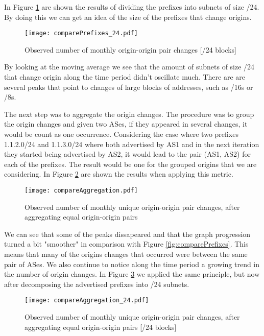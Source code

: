 \documentclass[11pt,a4paper]{scrreprt}
\begin{document}
In Figure \ref{fig:comparePrefixes_24} are shown the results of dividing the prefixes into subnets of size /24. By doing this we can get an idea of the size of the prefixes that change origins.  

\begin{figure}[!h]
\centering
\texttt{[image: comparePrefixes\_24.pdf]}
\caption{Observed number of monthly
origin-origin pair changes [/24 blocks]}
\label{fig:comparePrefixes_24}
\end{figure}

By looking at the moving average we see that the amount of subnets of size /24 that change origin along the time period didn't oscillate much. There are are several peaks that point to changes of large blocks of addresses, such as /16s or /8s.

The next step was to aggregate the origin changes. The procedure was to group the origin changes and given two ASes, if they appeared in several changes, it would be count as one occurrence. Considering the case where two prefixes 1.1.2.0/24 and 1.1.3.0/24 where both advertised by AS1 and in the next iteration they started being advertised by AS2, it would lead to the pair (AS1, AS2) for each of the prefixes. The result would be one for the grouped origins that we are considering. In Figure \ref{fig:compareAggregation} are shown the results when applying this metric.       

\begin{figure}[!h]
\centering
\texttt{[image: compareAggregation.pdf]}
\caption{Observed number of monthly
unique origin-origin pair changes, after aggregating equal origin-origin pairs}
\label{fig:compareAggregation}
\end{figure}

We can see that some of the peaks dissapeared and that the graph progression turned a bit "smoother" in comparison with Figure \ref{fig:comparePrefixes}. This means that many of the origins changes that occurred were between the same pair of ASes. We also continue to notice along the time period a growing trend in the number of origin changes.
In Figure \ref{fig:compareAggregation24} we applied the same principle, but now after decomposing the advertised prefixes into /24 subnets. 


\begin{figure}[!h]
\centering
\texttt{[image: compareAggregation\_24.pdf]}
\caption{Observed number of monthly
unique origin-origin pair changes, after aggregating equal origin-origin pairs [/24 blocks]}
\label{fig:compareAggregation24}
\end{figure}
\end{document}
